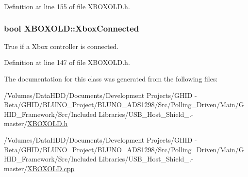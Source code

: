 \-Definition at line 155 of file \-X\-B\-O\-X\-O\-L\-D.\-h.

\hypertarget{class_x_b_o_x_o_l_d_aa091ff52ba7ad4216b0cd0f18651b755}{
\subsubsection[{\-Xbox\-Connected}]{\setlength{\rightskip}{0pt plus 5cm}bool {\bf \-X\-B\-O\-X\-O\-L\-D\-::\-Xbox\-Connected}}}\label{class_x_b_o_x_o_l_d_aa091ff52ba7ad4216b0cd0f18651b755}
\-True if a \-Xbox controller is connected. 

\-Definition at line 147 of file \-X\-B\-O\-X\-O\-L\-D.\-h.



\-The documentation for this class was generated from the following files\-:\begin{DoxyCompactItemize}
\item 
/\-Volumes/\-Data\-H\-D\-D/\-Documents/\-Development Projects/\-G\-H\-I\-D -\/ Beta/\-G\-H\-I\-D/\-B\-L\-U\-N\-O\-\_\-\-Project/\-B\-L\-U\-N\-O\-\_\-\-A\-D\-S1298/\-Src/\-Polling\-\_\-\-Driven/\-Main/\-G\-H\-I\-D\-\_\-\-Framework/\-Src/\-Included Libraries/\-U\-S\-B\-\_\-\-Host\-\_\-\-Shield\-\_.-\/master/\hyperlink{_x_b_o_x_o_l_d_8h}{\-X\-B\-O\-X\-O\-L\-D.\-h}\item 
/\-Volumes/\-Data\-H\-D\-D/\-Documents/\-Development Projects/\-G\-H\-I\-D -\/ Beta/\-G\-H\-I\-D/\-B\-L\-U\-N\-O\-\_\-\-Project/\-B\-L\-U\-N\-O\-\_\-\-A\-D\-S1298/\-Src/\-Polling\-\_\-\-Driven/\-Main/\-G\-H\-I\-D\-\_\-\-Framework/\-Src/\-Included Libraries/\-U\-S\-B\-\_\-\-Host\-\_\-\-Shield\-\_.-\/master/\hyperlink{_x_b_o_x_o_l_d_8cpp}{\-X\-B\-O\-X\-O\-L\-D.\-cpp}\end{DoxyCompactItemize}
